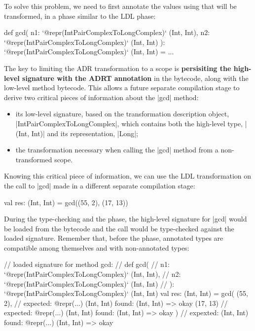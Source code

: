 To solve this problem, we need to first annotate the values using that will be transformed, in a phase similar to the LDL \inject{} phase:

\begin{lstlisting-nobreak}
def gcd(
    n1: `@repr(IntPairComplexToLongComplex)` (Int, Int),
    n2: `@repr(IntPairComplexToLongComplex)` (Int, Int)
  ): `@repr(IntPairComplexToLongComplex)` (Int, Int) = ...
\end{lstlisting-nobreak}

The key to limiting the ADR transformation to a scope is \textbf{persisiting the high-level signature with the ADRT annotation} in the bytecode, along with the low-level method bytecode. This allows a future separate compilation stage to derive two critical pieces of information about the |gcd| method:

\begin{itemize}
  \item its low-level signature, based on the transformation description object, \\ |IntPairComplexToLongComplex|, which contains both the high-level type, |(Int, Int)| and its representation, |Long|;
  \item the transformation necessary when calling the |gcd| method from a non-transformed scope.
\end{itemize}

Knowing this critical piece of information, we can use the LDL transformation on the call to |gcd| made in a different separate compilation stage:

\begin{lstlisting-nobreak}
val res: (Int, Int) = gcd((55, 2), (17, 13))
\end{lstlisting-nobreak}

During the type-checking and the \inject{} phase, the high-level signature for |gcd| would be loaded from the bytecode and the call would be type-checked against the loaded signature. Remember that, before the \coerce{} phase, annotated types are compatible among themselves and with non-annotated types:

\begin{lstlisting-nobreak}
// loaded signature for method gcd:
//  def gcd(
//      n1: `@repr(IntPairComplexToLongComplex)` (Int, Int),
//      n2: `@repr(IntPairComplexToLongComplex)` (Int, Int)
//    ): `@repr(IntPairComplexToLongComplex)` (Int, Int)
val res: (Int, Int) =
  gcd(
    (55, 2),   // expected: @repr(...) (Int, Int) found: (Int, Int) => okay
    (17, 13)  // expected: @repr(...) (Int, Int) found: (Int, Int) => okay
  )             // expexted: (Int, Int) found: @repr(...) (Int, Int) => okay
\end{lstlisting-nobreak}

